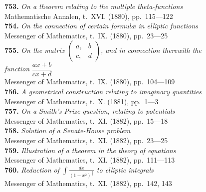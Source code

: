 \documentclass[12pt,a4paper,oneside]{book}
\theoremstyle{plain}
\theoremstyle{definition}
\theoremstyle{remark}
\begin{document}
\textbf{753.} \textit{On a theorem relating to the multiple theta-functions} \\
\hspace*{2em}Mathematische Annalen, t.~XVI. (1880), pp.~115---122\\[0.3em]
\textbf{754.} \textit{On the connection of certain formul\ae{} in elliptic functions} \\
\hspace*{2em}Messenger of Mathematics, t.~IX. (1880), pp.~23---25\\[0.3em]
\textbf{755.} \textit{On the matrix $\begin{pmatrix} a, & b \\ c, & d \end{pmatrix}$, and in connection therewith the}\\
\hspace*{2em}\textit{function} $\dfrac{ax+b}{cx+d}$ \\
\hspace*{2em}Messenger of Mathematics, t.~IX. (1880), pp.~104---109\\[0.3em]
\textbf{756.} \textit{A geometrical construction relating to imaginary quantities} \\
\hspace*{2em}Messenger of Mathematics, t.~X. (1881), pp.~1---3\\[0.3em]
\textbf{757.} \textit{On a Smith's Prize question, relating to potentials} \\
\hspace*{2em}Messenger of Mathematics, t.~XI. (1882), pp.~15---18\\[0.3em]
\textbf{758.} \textit{Solution of a Senate-House problem} \\
\hspace*{2em}Messenger of Mathematics, t.~XI. (1882), pp.~23---25\\[0.3em]
\textbf{759.} \textit{Illustration of a theorem in the theory of equations} \\
\hspace*{2em}Messenger of Mathematics, t.~XI. (1882), pp.~111---113\\[0.3em]
\textbf{760.} \textit{Reduction of $\displaystyle\int\!\frac{dx}{(1-x^2)^{\frac{2}{3}}}$ to elliptic integrals} \\
\hspace*{2em}Messenger of Mathematics, t.~XI. (1882), pp.~142, 143\\[0.3em]
\end{document}
